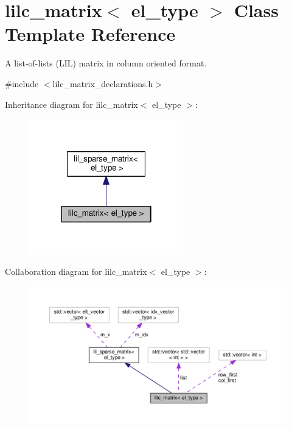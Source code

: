 \hypertarget{classlilc__matrix}{}\section{lilc\+\_\+matrix$<$ el\+\_\+type $>$ Class Template Reference}
\label{classlilc__matrix}


A list-\/of-\/lists (L\+IL) matrix in column oriented format.  




{\ttfamily \#include $<$lilc\+\_\+matrix\+\_\+declarations.\+h$>$}



Inheritance diagram for lilc\+\_\+matrix$<$ el\+\_\+type $>$\+:\nopagebreak
\begin{figure}[H]
\begin{center}
\leavevmode
\includegraphics[width=190pt]{classlilc__matrix__inherit__graph}
\end{center}
\end{figure}


Collaboration diagram for lilc\+\_\+matrix$<$ el\+\_\+type $>$\+:\nopagebreak
\begin{figure}[H]
\begin{center}
\leavevmode
\includegraphics[width=350pt]{classlilc__matrix__coll__graph}
\end{center}
\end{figure}
